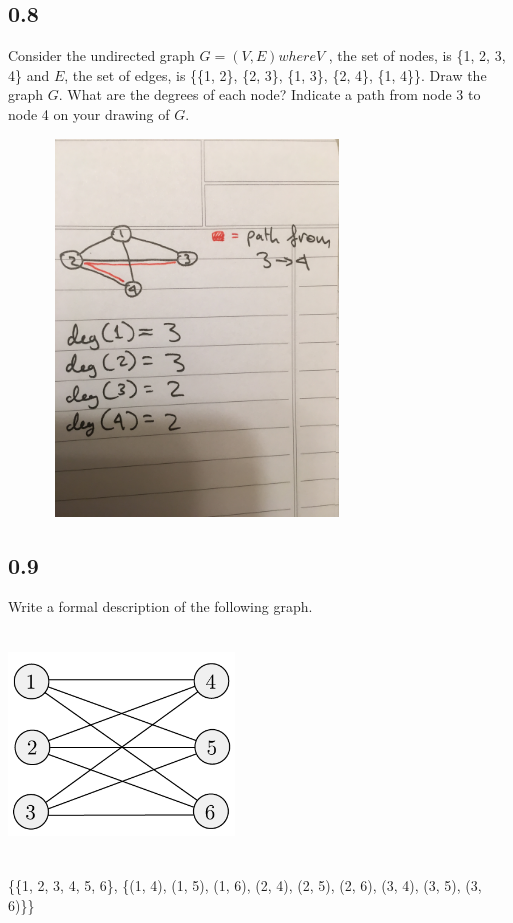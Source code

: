 \documentclass[11pt]{article}
\begin{document}
\subsection*{0.8}
Consider the undirected graph $G=(V,E) where V$ , the set of nodes, is \{1, 2, 3, 4\} and $E$, the set of edges, is \{\{1, 2\}, \{2, 3\}, \{1, 3\}, \{2, 4\}, \{1, 4\}\}. Draw the graph $G$. What are the degrees of each node? Indicate a path from node 3 to
node 4 on your drawing of $G$.\\
\begin{center} \includegraphics[width=10cm,height=10cm,keepaspectratio]{exer08} \end{center}

\pagebreak
\subsection*{0.9}
Write a formal description of the following graph.
\begin{center} \includegraphics[width=6cm,height=6cm,keepaspectratio]{exer09} \end{center}
\{\{1, 2, 3, 4, 5, 6\}, \{(1, 4), (1, 5), (1, 6), (2, 4), (2, 5), (2, 6), (3, 4), (3, 5), (3, 6)\}\}
\end{document}
